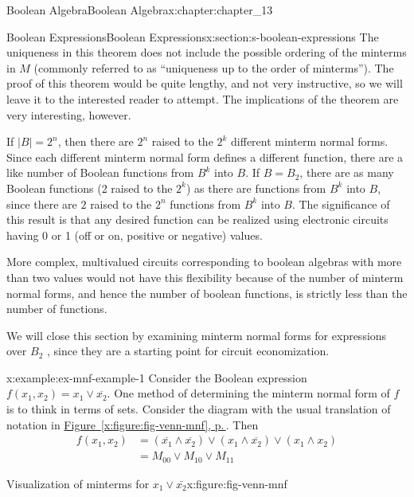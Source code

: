 \documentclass[twoside,10pt,]{book}
\newcommand{\xreffont}{\relax}
\numberwithin{equation}{section}
\begin{document}
\begin{chapterptx}{Boolean Algebra}{}{Boolean Algebra}{}{}{x:chapter:chapter_13}
\begin{sectionptx}{Boolean Expressions}{}{Boolean Expressions}{}{}{x:section:s-boolean-expressions}
The uniqueness in this theorem does not include the possible ordering of the minterms in \(M\) (commonly referred to as ``uniqueness up to the order of minterms''). The proof of this theorem would be quite lengthy, and not very instructive, so we will leave it to the interested reader to attempt. The implications of the theorem are very interesting, however.%
\par
If \(\lvert B\rvert =2^n\), then there are \(2^n\) raised to the \(2^k\) different minterm normal forms. Since each different minterm normal form defines a different function, there are a like number of Boolean functions from \(B^k\) into \(B\).  If \(B=B_2\), there are as many Boolean functions (2 raised to the \(2^k\)) as there are functions from \(B^k\) into \(B\), since there are \(2\) raised to the \(2^{n}\) functions from \(B^k\) into \(B\).  The significance of this result is that any desired function can be realized using electronic circuits having 0 or 1 (off or on, positive or negative) values.%
\par
More complex, multivalued circuits corresponding to boolean algebras with more than two values would not have this flexibility because of the number of minterm normal forms, and hence the number of boolean functions, is strictly less than the number of functions.%
\par
We will close this section by examining minterm normal forms for expressions over \(B_2\) , since they are a starting point for circuit economization.%
\begin{example}{}{x:example:ex-mnf-example-1}%
Consider the Boolean expression \(f\left(x_1, x_2\right) =x_1 \lor \overline{x_2} \). One method of determining the minterm normal form of \(f\) is to think in terms of sets. Consider the diagram with the usual translation of notation in \hyperref[x:figure:fig-venn-mnf]{Figure~{\xreffont\ref{x:figure:fig-venn-mnf}}, p.\,\pageref{x:figure:fig-venn-mnf}}. Then%
\begin{equation*}
\begin{split}
f\left(x_1, x_2\right)&=\left(\overline{x_1}\land \overline{x_2}\right)\lor \left(x_1\land \overline{x_2}\right)\lor \left(x_1\land
x_2\right)\\
& = M_{00} \lor M_{10} \lor M_{11}
\end{split}
\end{equation*}
%
\begin{figureptx}{Visualization of minterms for \(x_1 \lor \bar{x_2}\)}{x:figure:fig-venn-mnf}{}%
\begin{image}{0.15}{0.7}{0.15}%

\end{image}
\end{figureptx}
\end{example}
\end{sectionptx}
\end{chapterptx}
\end{document}
